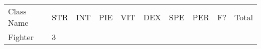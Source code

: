 \documentclass[12pt]{article}
\newcommand{\indexClass}[1]{\index{#1}}
\newcommand{\class}[1]{#1\indexClass{#1}}
\begin{document}
\begin{longtable}[]{@{}llllllllll@{}}
\toprule
\begin{minipage}[t]{0.13\columnwidth}\raggedright\strut
Class Name
\strut\end{minipage} &
\begin{minipage}[t]{0.06\columnwidth}\raggedright\strut
STR
\strut\end{minipage} &
\begin{minipage}[t]{0.06\columnwidth}\raggedright\strut
INT
\strut\end{minipage} &
\begin{minipage}[t]{0.06\columnwidth}\raggedright\strut
PIE
\strut\end{minipage} &
\begin{minipage}[t]{0.06\columnwidth}\raggedright\strut
VIT
\strut\end{minipage} &
\begin{minipage}[t]{0.06\columnwidth}\raggedright\strut
DEX
\strut\end{minipage} &
\begin{minipage}[t]{0.06\columnwidth}\raggedright\strut
SPE
\strut\end{minipage} &
\begin{minipage}[t]{0.06\columnwidth}\raggedright\strut
PER
\strut\end{minipage} &
\begin{minipage}[t]{0.07\columnwidth}\raggedright\strut
F?
\strut\end{minipage} &
\begin{minipage}[t]{0.08\columnwidth}\raggedright\strut
Total
\strut\end{minipage}\tabularnewline
\begin{minipage}[t]{0.13\columnwidth}\raggedright\strut
\class{Fighter}
\strut\end{minipage} &
\begin{minipage}[t]{0.06\columnwidth}\raggedright\strut
3
\strut\end{minipage} &
\begin{minipage}[t]{0.06\columnwidth}\raggedright\strut
\strut\end{minipage} &
\begin{minipage}[t]{0.06\columnwidth}\raggedright\strut
\strut\end{minipage} &
\begin{minipage}[t]{0.06\columnwidth}\raggedright\strut
\strut\end{minipage} &
\begin{minipage}[t]{0.06\columnwidth}\raggedright\strut

\end{minipage}
\end{longtable}
\end{document}
